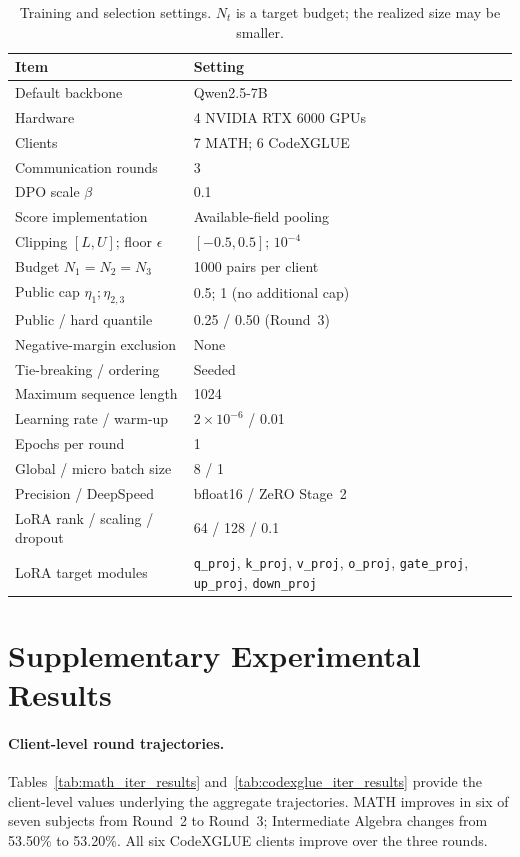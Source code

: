 \begin{table}[t]
\centering
\small
\caption{Training and selection settings. $N_t$ is a target budget;
the realized size may be smaller.}
\label{tab:hyperparameters}
\setlength{\tabcolsep}{3pt}
\renewcommand{\arraystretch}{1.02}
\begin{tabular}{@{}p{}p{}@{}}
\toprule
\textbf{Item} & \textbf{Setting} \\
\midrule
Default backbone & Qwen2.5-7B \\
Hardware & 4 NVIDIA RTX 6000 GPUs \\
Clients & 7 MATH; 6 CodeXGLUE \\
Communication rounds & 3 \\
DPO scale $\beta$ & 0.1 \\
Score implementation & Available-field pooling \\
Clipping $[L,U]$; floor $\epsilon$ & $[-0.5,0.5]$; $10^{-4}$ \\
Budget $N_1=N_2=N_3$ & 1000 pairs per client \\
Public cap $\eta_1;\eta_{2,3}$ & 0.5; 1 (no additional cap) \\
Public / hard quantile & 0.25 / 0.50 (Round~3) \\
Negative-margin exclusion & None \\
Tie-breaking / ordering & Seeded \\
Maximum sequence length & 1024 \\
Learning rate / warm-up & $2\times10^{-6}$ / 0.01 \\
Epochs per round & 1 \\
Global / micro batch size & 8 / 1 \\
Precision / DeepSpeed & bfloat16 / ZeRO Stage~2 \\
LoRA rank / scaling / dropout & 64 / 128 / 0.1 \\
LoRA target modules & \texttt{q\_proj}, \texttt{k\_proj},
\texttt{v\_proj}, \texttt{o\_proj}, \texttt{gate\_proj},
\texttt{up\_proj}, \texttt{down\_proj} \\
\bottomrule
\end{tabular}
\end{table}

\section{Supplementary Experimental Results}
\label{app:additional-results}

\paragraph{Client-level round trajectories.}
Tables~\ref{tab:math_iter_results} and~\ref{tab:codexglue_iter_results}
provide the client-level values underlying the aggregate trajectories.
MATH improves in six of seven subjects from Round~2 to Round~3;
Intermediate Algebra changes from 53.50\% to 53.20\%.
All six CodeXGLUE clients improve over the three rounds.

